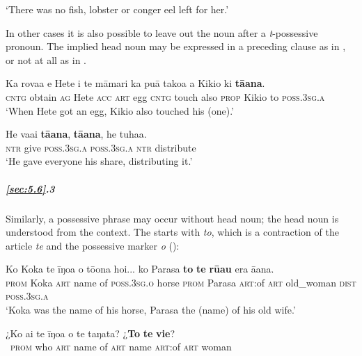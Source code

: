 \glt
‘There was no fish, lobster or conger eel left for her.’ \textstyleExampleref{[Mtx-4-04.003]}
\z

In other cases it is also possible to leave out the noun after a \textit{t}{}-possessive pronoun. The implied head noun may be expressed in a preceding clause as in , or not at all as in .

\ea\label{ex:5.100}
\gll Ka rova{\ꞌ}a e Hete i te māmari ka puā tako{\ꞌ}a a Kikio ki \textbf{tā{\ꞌ}ana}. \\
\textsc{cntg} obtain \textsc{ag} Hete \textsc{acc} \textsc{art} egg \textsc{cntg} touch also \textsc{prop} Kikio to \textsc{poss.3sg.a} \\

\glt 
‘When Hete got an egg, Kikio also touched his (one).’ \textstyleExampleref{[R438.042]} 
\z

\ea\label{ex:5.101}
\gll He va{\ꞌ}ai \textbf{tā{\ꞌ}ana}, \textbf{tā{\ꞌ}ana}, he tuha{\ꞌ}a. \\
\textsc{ntr} give \textsc{poss.3sg.a} \textsc{poss.3sg.a} \textsc{ntr} distribute \\

\glt 
‘He gave everyone his share, distributing it.’ \textstyleExampleref{[R372.123]} 
\z

\subparagraph{\ref{sec:5.6}.3} Similarly, a possessive phrase may occur without head noun; the head noun is understood from the context. The  starts with \textit{to}, which is a contraction of the article \textit{te} and the possessive marker \textit{o} ():

\ea\label{ex:5.102}
\gll Ko Koka te {\ꞌ}īŋoa o tō{\ꞌ}ona hoi... ko Parasa \textbf{to} \textbf{te} \textbf{rū{\ꞌ}au} era  {\ꞌ}ā{\ꞌ}ana.\\
\textsc{prom} Koka \textsc{art} name of \textsc{poss.3sg.o} horse \textsc{prom} Parasa \textsc{art}:of \textsc{art} old\_woman \textsc{dist}  \textsc{poss.3sg.a}\\

\glt 
‘Koka was the name of his horse, Parasa the (name) of his old wife.’ \textstyleExampleref{[R539-1.420]}
\z

\ea\label{ex:5.103}
\gll ¿Ko ai te {\ꞌ}īŋoa o te taŋata? ¿\textbf{To} \textbf{te} \textbf{vi{\ꞌ}e}? \\
~\textsc{prom} who \textsc{art} name of \textsc{art} name \textsc{art}:of \textsc{art} woman \\

